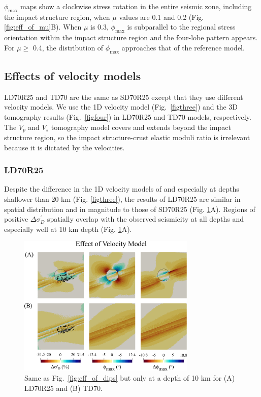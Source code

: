 \documentclass[draft]{agujournal2018}
\begin{document}
$\phi_{\max}$ maps show a clockwise stress rotation in the entire seismic zone, including the impact structure region, when $\mu$ values are 0.1 and 0.2 (Fig. \ref{fig:eff_of_mu}B). When $\mu$ is 0.3, $\phi_{\max}$ is subparallel to the regional stress orientation within the impact structure region and the four-lobe pattern appears. For $\mu \ge$ 0.4, the distribution of $\phi_{\max}$ approaches that of the reference model.


\subsection{Effects of velocity models}
LD70R25 and TD70 are the same as SD70R25 except that they use different velocity models. We use the 1D velocity model \citep{lamontagne1999} (Fig.~\ref{figthree}) and the 3D tomography results \citep{Powell_2017} (Fig.~\ref{figfour}) in LD70R25 and TD70 models, respectively. The $V_p$ and $V_s$ tomography model covers and extends beyond the impact structure region, so the impact structure-crust elastic moduli ratio is irrelevant because it is dictated by the velocities.

\subsubsection{LD70R25}
Despite the difference in the 1D velocity models of \citet{lamontagne1999} and \citet{Somerville1990} especially at depths shallower than 20 km (Fig. \ref{figthree}), the results of LD70R25 are similar in spatial distribution and in magnitude to those of SD70R25 (Fig. \ref{fig:eff_of_vel}A). Regions of positive $\Delta\sigma_{D}^{\prime}$ spatially overlap with the observed seismicity at all depths and especially well at 10 km depth (Fig. \ref{fig:eff_of_vel}A).  

\begin{figure}[ht]
\centering
\includegraphics[width=20pc]{Figures/LD70R25_TD70_2.png}
\caption{Same as Fig.~\ref{fig:eff_of_dips} but only at a depth of 10 km for (A) LD70R25 and (B) TD70.}
\label{fig:eff_of_vel}
\end{figure}
\end{document}
